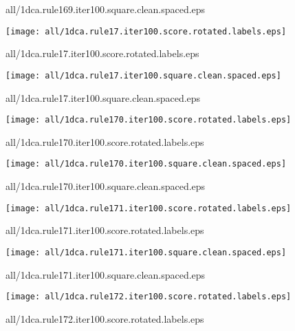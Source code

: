\documentclass{article}
\begin{document}
{\footnotesize all/1dca.rule169.iter100.square.clean.spaced.eps}
\begin{center}
\begin{minipage}{\textwidth}
\texttt{[image: all/1dca.rule17.iter100.score.rotated.labels.eps]}
\end{minipage}
\end{center}
{\footnotesize all/1dca.rule17.iter100.score.rotated.labels.eps}
\begin{center}
\begin{minipage}{\textwidth}
\texttt{[image: all/1dca.rule17.iter100.square.clean.spaced.eps]}
\end{minipage}
\end{center}
{\footnotesize all/1dca.rule17.iter100.square.clean.spaced.eps}
\begin{center}
\begin{minipage}{\textwidth}
\texttt{[image: all/1dca.rule170.iter100.score.rotated.labels.eps]}
\end{minipage}
\end{center}
{\footnotesize all/1dca.rule170.iter100.score.rotated.labels.eps}
\begin{center}
\begin{minipage}{\textwidth}
\texttt{[image: all/1dca.rule170.iter100.square.clean.spaced.eps]}
\end{minipage}
\end{center}
{\footnotesize all/1dca.rule170.iter100.square.clean.spaced.eps}
\begin{center}
\begin{minipage}{\textwidth}
\texttt{[image: all/1dca.rule171.iter100.score.rotated.labels.eps]}
\end{minipage}
\end{center}
{\footnotesize all/1dca.rule171.iter100.score.rotated.labels.eps}
\begin{center}
\begin{minipage}{\textwidth}
\texttt{[image: all/1dca.rule171.iter100.square.clean.spaced.eps]}
\end{minipage}
\end{center}
{\footnotesize all/1dca.rule171.iter100.square.clean.spaced.eps}
\begin{center}
\begin{minipage}{\textwidth}
\texttt{[image: all/1dca.rule172.iter100.score.rotated.labels.eps]}
\end{minipage}
\end{center}
{\footnotesize all/1dca.rule172.iter100.score.rotated.labels.eps}
\end{document}
